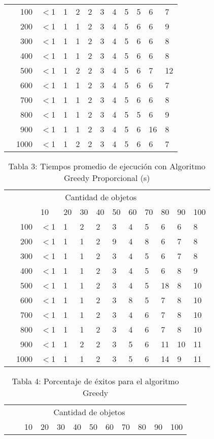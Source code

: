 \documentclass{article}
\begin{document}
\begin{center}
\begin{table}[ht]
\begin{tabularx}{0.8\textwidth}{Xr|XXXXXXXXXX}
\parbox[t]{2mm}{}&100&$<$1&1&2&2&3&4&5&5&6&7\\
&200&$<$1&1&1&2&3&4&5&6&6&9\\
&300&$<$1&1&1&2&3&4&5&6&6&8\\
&400&$<$1&1&1&2&3&4&5&6&6&8\\
&500&$<$1&1&2&2&3&4&5&6&7&12\\
&600&$<$1&1&1&2&3&4&5&6&6&7\\
&700&$<$1&1&1&2&3&4&5&6&6&8\\
&800&$<$1&1&1&2&3&4&5&5&6&9\\
&900&$<$1&1&1&2&3&4&5&6&16&8\\
&1000&$<$1&1&2&2&3&4&5&6&6&7\\
\end{tabularx}
\end{table}
\begin{table}[ht]
\centering
\caption*{Tabla 3: Tiempos promedio de ejecución con Algoritmo Greedy Proporcional (\textmu s)}
\label{3}
\begin{tabularx}{0.8\textwidth}{Xr|XXXXXXXXXX}
&\multicolumn{10}{c}{Cantidad de objetos} \\
&&10&20&30&40&50&60&70&80&90&100\\\hline
\parbox[t]{2mm}{}&100&$<$1&1&2&2&3&4&5&6&6&8\\
&200&$<$1&1&1&2&9&4&8&6&7&8\\
&300&$<$1&1&1&2&3&4&5&6&7&8\\
&400&$<$1&1&1&2&3&4&5&6&8&9\\
&500&$<$1&1&1&2&3&4&5&18&8&10\\
&600&$<$1&1&1&2&3&8&5&7&8&10\\
&700&$<$1&1&1&2&3&4&6&7&8&10\\
&800&$<$1&1&1&2&3&4&6&7&8&10\\
&900&$<$1&1&2&2&3&5&6&11&10&11\\
&1000&$<$1&1&1&2&3&5&6&14&9&11\\
\end{tabularx}
\end{table}
\begin{table}[ht]
\centering
\caption*{Tabla 4: Porcentaje de éxitos para el algoritmo Greedy}
\label{4}
\begin{tabularx}{0.8\textwidth}{Xr|XXXXXXXXXX}
&\multicolumn{10}{c}{Cantidad de objetos} \\
&&10&20&30&40&50&60&70&80&90&100\\\hline

\end{tabularx}
\end{table}
\end{center}
\end{document}
